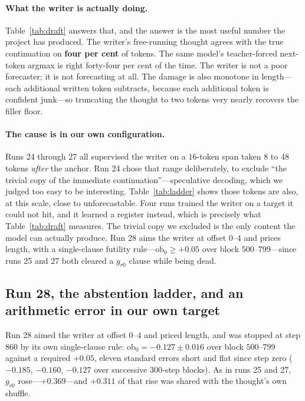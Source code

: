 \documentclass{article} %
\begin{document}
\paragraph{What the writer is actually doing.} Table~\ref{tab:draft} answers that, and the answer is the most useful number the project has produced. The writer's free-running thought agrees with the true continuation on \textbf{four per cent} of tokens. The same model's teacher-forced next-token argmax is right forty-four per cent of the time. The writer is not a poor forecaster; it is not forecasting at all. The damage is also monotone in length---each additional written token subtracts, because each additional token is confident junk---so truncating the thought to two tokens very nearly recovers the filler floor.

\paragraph{The cause is in our own configuration.} Runs 24 through 27 all supervised the writer on a $16$-token span taken $8$ to $48$ tokens \emph{after} the anchor. Run 24 chose that range deliberately, to exclude ``the trivial copy of the immediate continuation''---speculative decoding, which we judged too easy to be interesting. Table~\ref{tab:ladder} shows those tokens are also, at this scale, close to unforecastable. Four runs trained the writer on a target it could not hit, and it learned a register instead, which is precisely what Table~\ref{tab:draft} measures. The trivial copy we excluded is the only content the model can actually produce. Run 28 aims the writer at offset $0$--$4$ and prices length, with a single-clause futility rule---$\mathrm{ob}_0 \ge +0.05$ over block $500$--$799$---since runs 25 and 27 both cleared a $g_{r0}$ clause while being dead.

\subsection{Run 28, the abstention ladder, and an arithmetic error in our own target}
\label{sec:run28}

Run 28 aimed the writer at offset $0$--$4$ and priced length, and was stopped at step $860$ by its own single-clause rule: $\mathrm{ob}_0 = -0.127 \pm 0.016$ over block $500$--$799$ against a required $+0.05$, eleven standard errors short and flat since step zero ($-0.185$, $-0.160$, $-0.127$ over successive $300$-step blocks). As in runs 25 and 27, $g_{r0}$ rose---$+0.369$---and $+0.311$ of that rise was shared with the thought's own shuffle.
\end{document}
